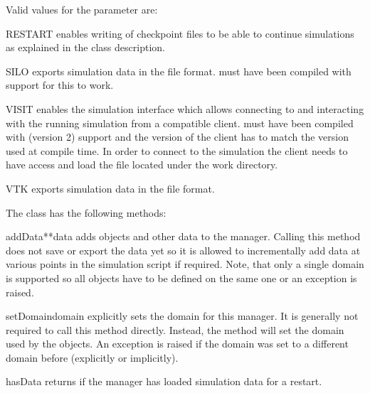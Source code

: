 \noindent Valid values for the  parameter are:
\begin{memberdesc}[DataManager]{RESTART}
    enables writing of checkpoint files to be able to continue simulations
    as explained in the class description.
\end{memberdesc}
\begin{memberdesc}[DataManager]{SILO}
    exports simulation data in the \SILO file format. \escript must have
    been compiled with \SILO support for this to work.
\end{memberdesc}
\begin{memberdesc}[DataManager]{VISIT}
    enables the \VisIt simulation interface which allows connecting to and
    interacting with the running simulation from a compatible \VisIt client.
    \escript must have been compiled with \VisIt (version 2) support and the
    version of the client has to match the version used at compile time.
    In order to connect to the simulation the client needs to have access and
    load the file  located under the work directory.
\end{memberdesc}
\begin{memberdesc}[DataManager]{VTK}
    exports simulation data in the \VTK file format.
\end{memberdesc}

\noindent The  class has the following methods:
\begin{methoddesc}[DataManager]{addData}{**data}
    adds \Data objects and other data to the manager. Calling this method does
    not save or export the data yet so it is allowed to incrementally add data
    at various points in the simulation script if required.
    Note, that only a single domain is supported so all \Data objects have to
    be defined on the same one or an exception is raised.
\end{methoddesc}

\begin{methoddesc}[DataManager]{setDomain}{domain}
    explicitly sets the domain for this manager.
    It is generally not required to call this method directly.
    Instead, the  method will set the domain used by the \Data
    objects.
    An exception is raised if the domain was set to a different domain before
    (explicitly or implicitly).
\end{methoddesc}

\begin{methoddesc}[DataManager]{hasData}{}
    returns \True if the manager has loaded simulation data for a restart.
\end{methoddesc}

